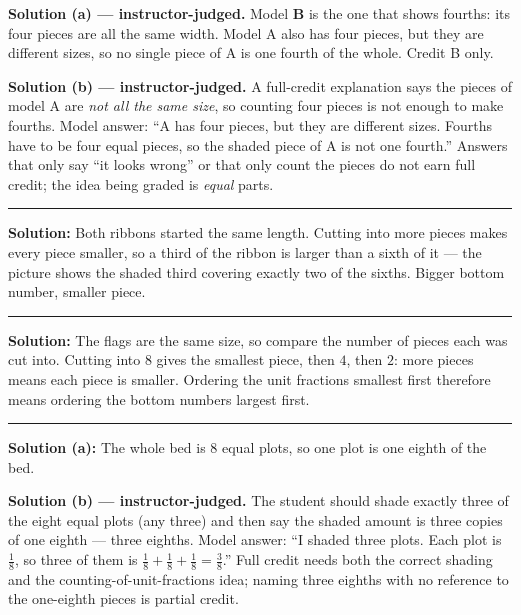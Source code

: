 \documentclass[12pt]{article}
\begin{document}
\textbf{Solution (a) --- instructor-judged.} Model \textbf{B} is the one that shows fourths: its four
pieces are all the same width. Model A also has four pieces, but they are different sizes, so no
single piece of A is one fourth of the whole. Credit B only.

\textbf{Solution (b) --- instructor-judged.} A full-credit explanation says the pieces of model A are
\emph{not all the same size}, so counting four pieces is not enough to make fourths. Model answer:
``A has four pieces, but they are different sizes. Fourths have to be four equal pieces, so the
shaded piece of A is not one fourth.'' Answers that only say ``it looks wrong'' or that only count
the pieces do not earn full credit; the idea being graded is \emph{equal} parts.

\vspace{0.15cm}\noindent\rule{\linewidth}{0.2pt}


\textbf{Solution:} Both ribbons started the same length. Cutting into more pieces makes every piece
smaller, so a third of the ribbon is larger than a sixth of it --- the picture shows the shaded third
covering exactly two of the sixths. Bigger bottom number, smaller piece. 

\vspace{0.15cm}\noindent\rule{\linewidth}{0.2pt}


\textbf{Solution:} The flags are the same size, so compare the number of pieces each was cut into.
Cutting into $8$ gives the smallest piece, then $4$, then $2$: more pieces means each piece is
smaller. Ordering the unit fractions smallest first therefore means ordering the bottom numbers
largest first. 

\vspace{0.15cm}\noindent\rule{\linewidth}{0.2pt}


\textbf{Solution (a):} The whole bed is $8$ equal plots, so one plot is one eighth of the bed. 

\textbf{Solution (b) --- instructor-judged.} The student should shade exactly three of the eight equal
plots (any three) and then say the shaded amount is three copies of one eighth --- three eighths.
Model answer: ``I shaded three plots. Each plot is $\frac{1}{8}$, so three of them is
$\frac{1}{8} + \frac{1}{8} + \frac{1}{8} = \frac{3}{8}$.'' Full credit needs both the correct
shading and the counting-of-unit-fractions idea; naming three eighths with no reference to the
one-eighth pieces is partial credit.
\end{document}
